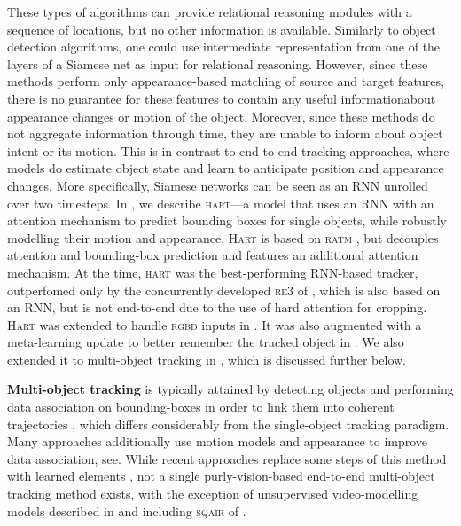 These types of algorithms can provide relational reasoning modules with a sequence of locations, but no other information is available.
Similarly to object detection algorithms, one could use intermediate representation from one of the layers of a Siamese net as input for relational reasoning.
However, since these methods perform only appearance-based matching of source and target features, there is no guarantee for these features to contain any useful information\eg about appearance changes or motion of the object.
Moreover, since these methods do not aggregate information through time, they are unable to inform about object intent or its motion.
This is in contrast to end-to-end tracking approaches, where models do estimate object state and learn to anticipate position and appearance changes.
More specifically, Siamese networks can be seen as an \gls{RNN} unrolled over two timesteps.
In , we describe \textsc{hart}---a model that uses an \gls{RNN} with an attention mechanism to predict bounding boxes for single objects, while robustly modelling their motion and appearance.
\textsc{Hart} is based on \textsc{ratm} \citep{Kahou2015ratm}, but decouples attention and bounding-box prediction and features an additional attention mechanism.
At the time, \textsc{hart} was the best-performing \gls{RNN}-based tracker, outperfomed only by the concurrently developed \textsc{re3} of \cite{Gordon2018re3}, which is also based on an \gls{RNN}, but is not end-to-end due to the use of hard attention for cropping.
\textsc{Hart} was extended to handle \textsc{rgbd} inputs in \cite{Danesh2019deep}. 
It was also augmented with a meta-learning update to better remember the tracked object in \cite{Li2019metahart}. We also extended it to multi-object tracking in , which is discussed further below.

%    
%
\textbf{Multi-object tracking} is typically attained by detecting objects and performing data association on bounding-boxes in order to link them into coherent trajectories \citep{Zhang2008,Milan2014,Bae2017confidence,Keuper2018motion}, which differs considerably from the single-object tracking paradigm.
Many approaches additionally use motion models and appearance to improve data association, see\eg \cite{Bewley2016sort}.
While recent approaches replace some steps of this method with learned elements \citep{Schulter2017deepnf,Nam2016,Ning2017,Keuper2018motion,Bae2017confidence,Xiang2015},  not a single purly-vision-based end-to-end multi-object tracking method exists, with the exception of unsupervised video-modelling models described in  and including \textsc{sqair} of .


